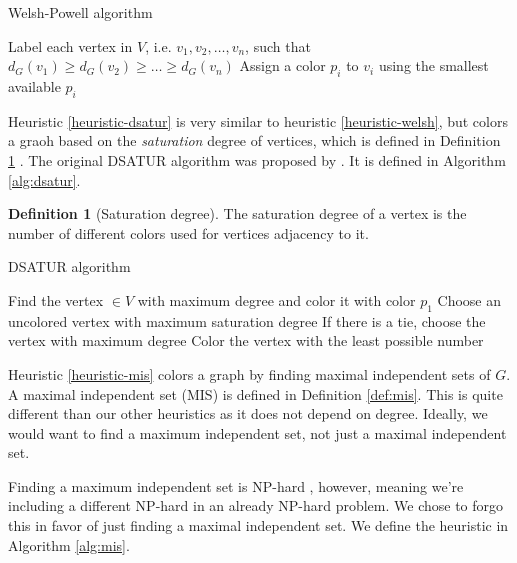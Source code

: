 \documentclass{article}
\newcounter{heuristic} \setcounter{heuristic}{0}
\theoremstyle{definition}
\newtheorem{definition}{Definition}
\begin{document}
\begin{algorithm}
\caption{Welsh-Powell algorithm}\label{alg:welsh}
\begin{algorithmic}[1]
\State Label each vertex in $V$, i.e. $v_1, v_2, \dots, v_n$, such that $d_G(v_1) \geq d_G(v_2) \geq \dots \geq d_G(v_n)$
\State Assign a color $p_i$ to $v_i$ using the smallest available $p_i$
\EndFor
\end{algorithmic}
\end{algorithm}

\label{heuristic-dsatur}

Heuristic \ref{heuristic-dsatur} is very similar to heuristic \ref{heuristic-welsh}, but colors a graoh based on the \emph{saturation} degree of vertices, which is defined in Definition \ref{def:sat} \cite{spinrad}. The original DSATUR algorithm was proposed by \cite{brelaz}. It is defined in Algorithm \ref{alg:dsatur}.

\begin{definition}[Saturation degree]\label{def:sat}
The saturation degree of a vertex is the number of different colors used for vertices adjacency to it.
\end{definition}

\begin{algorithm}
\caption{DSATUR algorithm}\label{alg:dsatur}
\begin{algorithmic}[1]
\State Find the vertex $\in V$ with maximum degree and color it with color $p_1$
\State Choose an uncolored vertex with maximum saturation degree
\State If there is a tie, choose the vertex with maximum degree
\State Color the vertex with the least possible number
\EndWhile
\end{algorithmic}
\end{algorithm}

\label{heuristic-mis}

Heuristic \ref{heuristic-mis} colors a graph by finding maximal independent sets of \(G\). A maximal independent set (MIS) is defined in Definition \ref{def:mis}. This is quite different than our other heuristics as it does not depend on degree. Ideally, we would want to find a maximum independent set, not just a maximal independent set.

Finding a maximum independent set is NP-hard \cite{karp1972reducibility}, however, meaning we're including a different NP-hard in an already NP-hard problem. We chose to forgo this in favor of just finding a maximal independent set. We define the heuristic in Algorithm \ref{alg:mis}.
\end{document}
